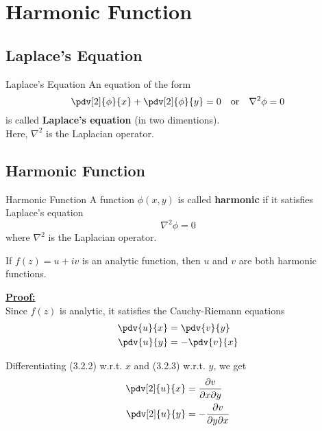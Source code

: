 
\section{Harmonic Function}

\subsection{Laplace's Equation}
\begin{definition}{Laplace's Equation}{}
    An equation of the form
    \begin{equation}
        \pdv[2]{\phi}{x} + \pdv[2]{\phi}{y} = 0
        \quad \text{or} \quad
        \nabla^2 \phi = 0
    \end{equation}
    is called \textbf{Laplace's equation} (in two dimentions). \\
    Here, $\nabla^2$ is the Laplacian operator.
\end{definition}

\subsection{Harmonic Function}
\begin{definition}{Harmonic Function}{}
    A function $\phi(x,y)$ is called \textbf{harmonic} if it satisfies Laplace's equation
    \begin{equation}
        \nabla^2 \phi = 0
    \end{equation}
    where $\nabla^2$ is the Laplacian operator.
\end{definition}

\begin{theorem}{}{}
    If $f(z) = u + iv$ is an analytic function, then $u$ and $v$ are both harmonic functions.
\end{theorem}

\underline{\textbf{Proof:}} \\
Since $f(z)$ is analytic, it satisfies the Cauchy-Riemann equations
\begin{align}
    \pdv{u}{x} &= \pdv{v}{y} \\
    \pdv{u}{y} &= -\pdv{v}{x}
\end{align}

Differentiating (3.2.2) w.r.t. $x$ and (3.2.3) w.r.t. $y$, we get
\begin{align}
    \pdv[2]{u}{x} &= \frac{\partial v}{\partial x \partial y} \\
    \pdv[2]{u}{y} &= -\frac{\partial v}{\partial y \partial x}
\end{align}

